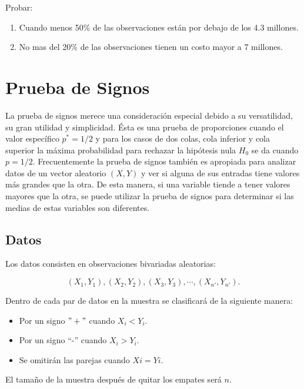 \documentclass[
  a4paper,
  oneside,
  openany]{book}
\providecommand{\tightlist}{%
  \setlength{\itemsep}{0pt}\setlength{\parskip}{0pt}}
\begin{document}
Probar:

\begin{enumerate}
\def\labelenumi{\alph{enumi})}
\item
  Cuando menos 50\% de las observaciones están por debajo de los 4.3 millones.
\item
  No mas del 20\% de las observaciones tienen un costo mayor a 7 millones.
\end{enumerate}

\hypertarget{prueba-de-signos}{%
\chapter{Prueba de Signos}\label{prueba-de-signos}}

La prueba de signos merece una consideración especial debido a su versatilidad, su gran utilidad y simplicidad. Ésta es una prueba de proporciones cuando el valor específico \(p^*=1/2\) y para los casos de dos colas, cola inferior y cola superior la máxima probabilidad para rechazar la hipótesis nula \(H_0\) se da cuando \(p = 1/2\). Frecuentemente la prueba de signos también es apropiada para analizar datos de un vector aleatorio \((X,Y)\) y ver si alguna de sus entradas tiene valores más grandes que la otra. De esta manera, si una variable tiende a tener valores mayores que la otra, se puede utilizar la prueba de signos para determinar si las medias de estas variables son diferentes.

\hypertarget{datos-2}{%
\section{Datos}\label{datos-2}}

Los datos consisten en observaciones bivariadas aleatorias:

\[(X_{1},Y_{1}),(X_{2},Y_{2}),(X_{3},Y_{3}),\cdots,(X_{n'},Y_{n'}).\]

Dentro de cada par de datos en la muestra se clasificará de la siguiente manera:

\begin{itemize}
\tightlist
\item
  Por un signo \("+"\) cuando \(X_{i} < Y_{i}\).
\item
  Por un signo ``-'' cuando \(X_{i} > Y_{i}\).
\item
  Se omitirán las parejas cuando \(Xi = Yi\).
\end{itemize}

El tamaño de la muestra después de quitar los empates será \(n\).
\end{document}
